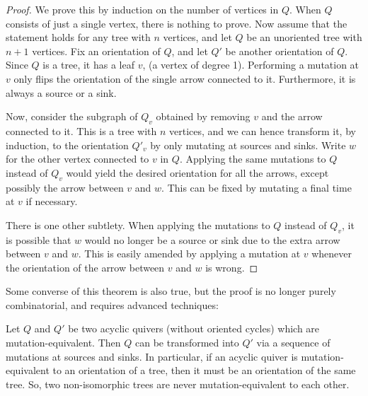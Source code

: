 \begin{proof}
	We prove this by induction on the number of vertices in $Q$. When $Q$ consists of just a single vertex, there is nothing to prove. Now assume that the statement holds for any tree with $n$ vertices, and let $Q$ be an unoriented tree with $n+1$ vertices. Fix an orientation of $Q$, and let $Q'$ be another orientation of $Q$. Since $Q$ is a tree, it has a leaf $v$, (a vertex of degree 1). Performing a mutation at $v$ only flips the orientation of the single arrow connected to it. Furthermore, it is always a source or a sink.

	Now, consider the subgraph of $Q_v$ obtained by removing $v$ and the arrow connected to
	it. This is a tree with $n$ vertices, and we can hence transform it, by induction, to
	the orientation $Q'_v$ by only mutating at sources and sinks. Write $w$ for the other
	vertex connected to $v$ in $Q$. Applying the same mutations to $Q$ instead of $Q_v$
	would yield the desired orientation for all the arrows, except possibly the arrow
	between $v$ and $w$. This can be fixed by mutating a final time at $v$ if necessary.

	There is one other subtlety. When applying the mutations to $Q$ instead of $Q_v$, it is
	possible that $w$ would no longer be a source or sink due to the extra arrow between
	$v$ and $w$. This is easily amended by applying a mutation at $v$ whenever the
	orientation of the arrow between $v$ and $w$ is wrong.
\end{proof}

Some converse of this theorem is also true, but the proof is no longer purely
combinatorial, and requires advanced techniques:
\begin{theorem}

	Let $Q$ and $Q'$ be two acyclic quivers (without oriented cycles)
	which are mutation-equivalent. Then $Q$ can be transformed into $Q'$ via a sequence of
	mutations at sources and sinks. In particular, if an acyclic quiver is
	mutation-equivalent to an orientation of a tree, then it must be an orientation of the
	same tree. So, two non-isomorphic trees are never mutation-equivalent to each other.
\end{theorem}


